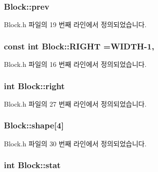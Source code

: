 \subsubsection[{\texorpdfstring{prev}{prev}}]{ Block\+::prev\hspace{0.3cm}{\ttfamily [private]}}\hypertarget{class_block_ab86ce4753987a3eb39058553fd81b462}{}\label{class_block_ab86ce4753987a3eb39058553fd81b462}


Block.\+h 파일의 19 번째 라인에서 정의되었습니다.

\subsubsection[{\texorpdfstring{R\+I\+G\+HT}{RIGHT}}]{\setlength{\rightskip}{0pt plus 5cm}const int Block\+::\+R\+I\+G\+HT ={\bf W\+I\+D\+TH}-\/1\hspace{0.3cm}{\ttfamily [static]}, {\ttfamily [private]}}\hypertarget{class_block_a446deab28dcc4d905bb33219eb6da3dc}{}\label{class_block_a446deab28dcc4d905bb33219eb6da3dc}


Block.\+h 파일의 16 번째 라인에서 정의되었습니다.

\subsubsection[{\texorpdfstring{right}{right}}]{\setlength{\rightskip}{0pt plus 5cm}int Block\+::right}\hypertarget{class_block_a370e4fb56e296b92eb2cc3916b3f39b2}{}\label{class_block_a370e4fb56e296b92eb2cc3916b3f39b2}


Block.\+h 파일의 27 번째 라인에서 정의되었습니다.

\subsubsection[{\texorpdfstring{shape}{shape}}]{ Block\+::shape\mbox{[}4\mbox{]}}\hypertarget{class_block_ae1a4e97236e1e5f04d21fc9227b8c3a8}{}\label{class_block_ae1a4e97236e1e5f04d21fc9227b8c3a8}


Block.\+h 파일의 30 번째 라인에서 정의되었습니다.

\subsubsection[{\texorpdfstring{stat}{stat}}]{\setlength{\rightskip}{0pt plus 5cm}int Block\+::stat\hspace{0.3cm}{\ttfamily [private]}}\hypertarget{class_block_a786c39534d84f71238f0189d8852e432}{}\label{class_block_a786c39534d84f71238f0189d8852e432}



